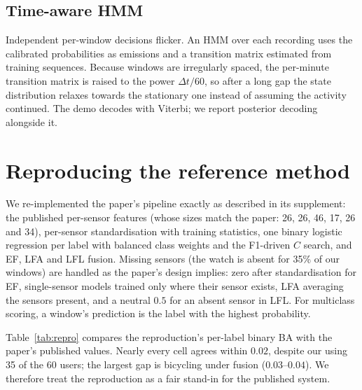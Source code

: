 \documentclass[11pt,a4paper]{article}
\begin{document}
\subsection{Time-aware HMM}
Independent per-window decisions flicker. An HMM over each recording uses the calibrated
probabilities as emissions and a transition matrix estimated from training sequences. Because
windows are irregularly spaced, the per-minute transition matrix is raised to the power
$\Delta t/60$, so after a long gap the state distribution relaxes towards the stationary
one instead of assuming the activity continued. The demo decodes with Viterbi; we report
posterior decoding alongside it.

\section{Reproducing the reference method}
\label{sec:repro}

We re-implemented the paper's pipeline exactly as described in its supplement: the
published per-sensor features (whose sizes match the paper: 26, 26, 46, 17, 26 and 34),
per-sensor standardisation with training statistics, one binary logistic regression per
label with balanced class weights and the F1-driven $C$ search, and EF, LFA and LFL
fusion. Missing sensors (the watch is absent for 35\% of our windows) are handled as
the paper's design implies: zero after standardisation for EF, single-sensor models
trained only where their sensor exists, LFA averaging the sensors present, and a neutral
$0.5$ for an absent sensor in LFL. For multiclass scoring, a window's prediction is the
label with the highest probability.

Table~\ref{tab:repro} compares the reproduction's per-label binary BA with the paper's
published values. Nearly every cell agrees within $0.02$, despite our using 35 of the 60
users; the largest gap is bicycling under fusion ($0.03$--$0.04$). We therefore treat the
reproduction as a fair stand-in for the published system.
\end{document}
